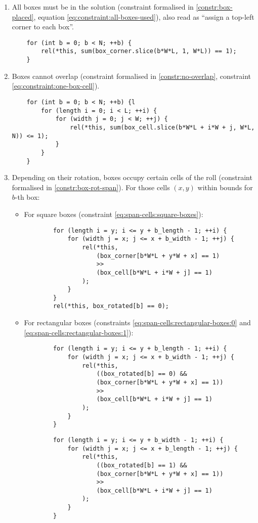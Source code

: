\begin{enumerate}
    \item All boxes must be in the solution (constraint formalised in
    \ref{constr:box-placed}, equation \ref{eq:constraint:all-boxes-used}),
    also read as ``assign a top-left corner to each box''.
    
	{\NOINDENT \begin{lstlisting}
    for (int b = 0; b < N; ++b) {
		rel(*this, sum(box_corner.slice(b*W*L, 1, W*L)) == 1);
	}
	\end{lstlisting}}
    
    \item Boxes cannot overlap (constraint formalised in
    \ref{constr:no-overlap}, constraint \ref{eq:constraint:one-box-cell}).
    
    {\NOINDENT \begin{lstlisting}
    for (int b = 0; b < N; ++b) {l
		for (length i = 0; i < L; ++i) {
			for (width j = 0; j < W; ++j) {
				rel(*this, sum(box_cell.slice(b*W*L + i*W + j, W*L, N)) <= 1);
			}
		}
	}
	\end{lstlisting}}
    
    \item Depending on their rotation, boxes occupy certain cells of the roll
    (constraint formalised in \ref{constr:box-rot-span}). For those cells $(x,y)$ within
    bounds for $b$-th box:

	\begin{itemize}
		\item For square boxes (constraint \ref{eq:span-cells:square-boxes}):
		{\NOINDENT \begin{lstlisting}
		for (length i = y; i <= y + b_length - 1; ++i) {
			for (width j = x; j <= x + b_width - 1; ++j) {
				rel(*this,
					(box_corner[b*W*L + y*W + x] == 1)
					>>
					(box_cell[b*W*L + i*W + j] == 1)
				);
			}
		}
		rel(*this, box_rotated[b] == 0);
		\end{lstlisting}}
		
		\item For rectangular boxes (constraints \ref{eq:span-cells:rectangular-boxes:0} and
		\ref{eq:span-cells:rectangular-boxes:1}):
		{\NOINDENT \begin{lstlisting}
		for (length i = y; i <= y + b_length - 1; ++i) {
			for (width j = x; j <= x + b_width - 1; ++j) {
				rel(*this,
					((box_rotated[b] == 0) &&
					(box_corner[b*W*L + y*W + x] == 1))
					>>
					(box_cell[b*W*L + i*W + j] == 1)
				);
			}
		}
		\end{lstlisting}}
		{\NOINDENT \begin{lstlisting}
		for (length i = y; i <= y + b_width - 1; ++i) {
			for (width j = x; j <= x + b_length - 1; ++j) {
				rel(*this,
					((box_rotated[b] == 1) &&
					(box_corner[b*W*L + y*W + x] == 1))
					>>
					(box_cell[b*W*L + i*W + j] == 1)
				);
			}
		}
		\end{lstlisting}}
	\end{itemize}
    

\end{enumerate}
